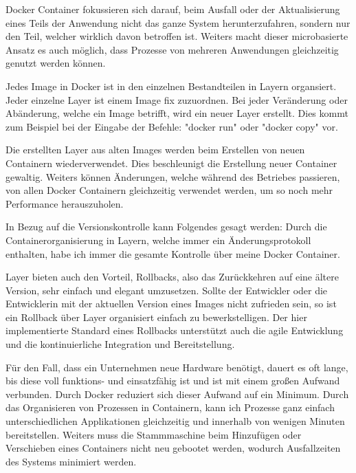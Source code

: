 

Docker Container fokussieren sich darauf, beim Ausfall oder der Aktualisierung eines Teils der Anwendung nicht das ganze System herunterzufahren, sondern nur den Teil, welcher wirklich davon betroffen ist. Weiters macht dieser microbasierte Ansatz es auch möglich, dass Prozesse von mehreren Anwendungen gleichzeitig genutzt werden können. \cite{DockerGrundlagen}


Jedes Image in Docker ist in den einzelnen Bestandteilen in Layern organsiert. Jeder einzelne Layer ist einem Image fix zuzuordnen. Bei jeder Veränderung oder Abänderung, welche ein Image betrifft, wird ein neuer Layer erstellt. Dies kommt zum Beispiel bei der Eingabe der Befehle: "docker run" oder "docker copy" vor. \cite{DockerGrundlagen}

Die erstellten Layer aus alten Images werden beim Erstellen von neuen Containern wiederverwendet. Dies beschleunigt die Erstellung neuer Container gewaltig. Weiters können Änderungen, welche während des Betriebes passieren, von allen Docker Containern gleichzeitig verwendet werden, um so noch mehr Performance herauszuholen. \cite{DockerGrundlagen}

In Bezug auf die Versionskontrolle kann Folgendes gesagt werden: Durch die Containerorganisierung in Layern, welche immer ein Änderungsprotokoll enthalten, habe ich immer die gesamte Kontrolle über meine Docker Container. \cite{DockerGrundlagen}


Layer bieten auch den Vorteil, Rollbacks, also das Zurückkehren auf eine ältere Version, sehr einfach und elegant umzusetzen. Sollte der Entwickler oder die Entwicklerin mit der aktuellen Version eines Images nicht zufrieden sein, so ist ein Rollback über Layer organisiert einfach zu bewerkstelligen. Der hier implementierte Standard eines Rollbacks unterstützt auch die agile Entwicklung und die kontinuierliche Integration und Bereitstellung. \cite{DockerGrundlagen}


Für den Fall, dass ein Unternehmen neue Hardware benötigt, dauert es oft lange, bis diese voll funktions- und einsatzfähig ist und ist mit einem großen Aufwand verbunden. Durch Docker reduziert sich dieser Aufwand auf ein Minimum. Durch das Organisieren von Prozessen in Containern, kann ich Prozesse ganz einfach unterschiedlichen Applikationen gleichzeitig und innerhalb von wenigen Minuten bereitstellen. Weiters muss die Stammmaschine beim Hinzufügen oder Verschieben eines Containers nicht neu gebootet werden, wodurch Ausfallzeiten des Systems minimiert werden. \cite{DockerGrundlagen}

